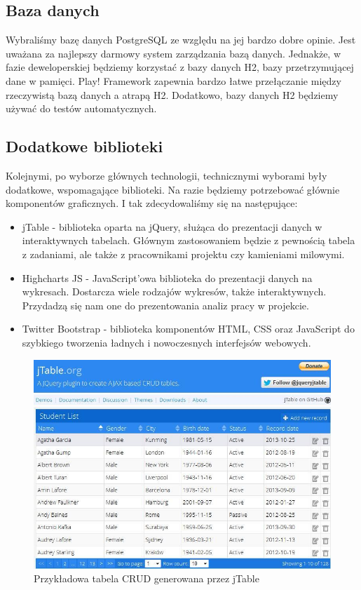 \documentclass[a4paper,12pt,notitlepage]{mwrep}
\begin{document}
\subsection{Baza danych}
Wybraliśmy bazę danych PostgreSQL ze względu na jej bardzo dobre opinie. Jest uważana za najlepszy darmowy system zarządzania 
bazą danych. Jednakże, w fazie deweloperskiej będziemy korzystać z bazy danych H2, bazy przetrzymującej dane w pamięci. Play! 
Framework zapewnia bardzo łatwe przełączanie między rzeczywistą bazą danych a atrapą H2. Dodatkowo, bazy danych H2 będziemy 
używać do testów automatycznych.

\subsection{Dodatkowe biblioteki}
Kolejnymi, po wyborze głównych technologii, technicznymi wyborami były dodatkowe, wspomagające biblioteki. Na razie 
będziemy potrzebować głównie komponentów graficznych. I tak zdecydowaliśmy się na następujące:
\begin{itemize}
	\item	jTable - biblioteka oparta na jQuery, służąca do prezentacji danych w interaktywnych tabelach. Głównym 
		zastosowaniem będzie z pewnością tabela z zadaniami, ale także z pracownikami projektu czy kamieniami 
		milowymi.
	\item	Highcharts JS - JavaScript'owa biblioteka do prezentacji danych na wykresach. Dostarcza wiele rodzajów 
		wykresów, także interaktywnych. Przydadzą się nam one do prezentowania analiz pracy w projekcie.
	\item	Twitter Bootstrap - biblioteka komponentów HTML, CSS oraz JavaScript do szybkiego tworzenia ładnych i nowoczesnych 
		interfejsów webowych.
\end{itemize}

\begin{figure}[H]
\centering
\includegraphics[scale=0.5]{images/jTable.png}
\caption{Przykładowa tabela CRUD generowana przez jTable}
\label{fig:jTable}
\end{figure}
\end{document}
